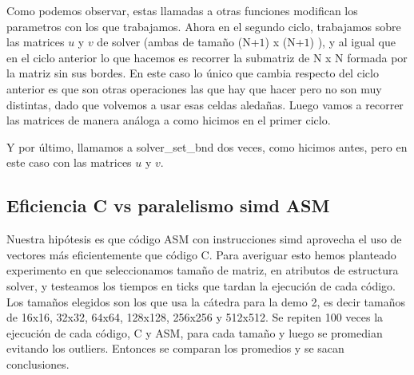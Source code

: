 \par Como podemos observar, estas llamadas a otras funciones modifican los parametros con los que trabajamos.
Ahora en el segundo ciclo, trabajamos sobre las matrices $u$ y $v$ de solver (ambas de tamaño (N+$1$) x (N+$1$) ), y al igual que en el ciclo anterior lo que hacemos es recorrer la submatriz de N x N formada por la matriz sin sus bordes.
En este caso lo único que cambia respecto del ciclo anterior es que son otras operaciones las que hay que hacer pero no son muy distintas, dado que volvemos a usar esas celdas aledañas.
Luego vamos a recorrer las matrices de manera análoga a como hicimos en el primer ciclo.
 \newline

\par Y por último, llamamos a solver\_set\_bnd dos veces, como hicimos antes, pero en este caso con las matrices $u$ y $v$.\newline

\subsection{Eficiencia C vs paralelismo simd ASM}
Nuestra hipótesis es que código ASM con instrucciones simd aprovecha el uso de vectores más eficientemente que código C. Para averiguar esto hemos planteado experimento en que seleccionamos tamaño de matriz, en atributos de estructura solver, y testeamos los tiempos en ticks que tardan la ejecución de cada código. Los tamaños elegidos son los que usa la cátedra para la demo 2, es decir tamaños de 16x16, 32x32, 64x64, 128x128, 256x256 y 512x512. Se repiten 100 veces la ejecución de cada código, C y ASM, para cada tamaño y luego se promedian evitando los outliers. Entonces se comparan los promedios y se sacan conclusiones.

